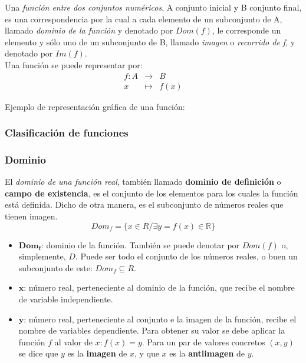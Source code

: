 
\begin{definition}
Una \emph{función entre dos conjuntos numéricos}, A conjunto inicial y B conjunto final, es una correspondencia por la cual a cada elemento de un subconjunto de A, llamado \emph{dominio de la función} y denotado por $Dom(f)$, le corresponde un elemento y sólo uno de un subconjunto de B, llamado \emph{imagen} o \emph{recorrido de f}, y denotado por $Im(f)$.\\
Una función se puede representar por:
$$
\begin{array}{rcl}
	f:A &\longrightarrow & B \\
	x & \mapsto & f(x)
\end{array}
$$
\end{definition}

Ejemplo de representación gráfica de una función:

\subsubsection{Clasificación de funciones}


\subsubsection{Dominio}
\begin{definition}
	El \emph{dominio de una función real}, también llamado \textbf{dominio de definición} o \textbf{campo de existencia}, es el conjunto de los elementos para los cuales la función está definida. Dicho de otra manera, es el subconjunto de números reales que tienen imagen.
	$$Dom_{f} =\{x \in R / \exists y = f(x) \in \mathbb{R}\}$$
\end{definition}
\begin{itemize} 
	\item $\mathbf{Dom_{f}}$: dominio de la función. También se puede denotar por $Dom(f)$ o, simplemente, $D$. Puede ser todo el conjunto de los números reales, o buen un subconjunto de este: $Dom_{f} \subseteq R$. 
	\item $\mathbf{x}$: número real, perteneciente al dominio de la función, que recibe el nombre de variable independiente. 
	\item $\mathbf{y}$: número real, perteneciente al conjunto e la imagen de la función, recibe el nombre de variables dependiente. Para obtener su valor se debe aplicar la función $f$ al valor de $x: f(x)=y$. Para un par de valores concretos $(x,y)$ se dice que $y$ es la \textbf{imagen} de $x$, y que $x$ es la \textbf{antiimagen} de $y$.
\end{itemize} 
